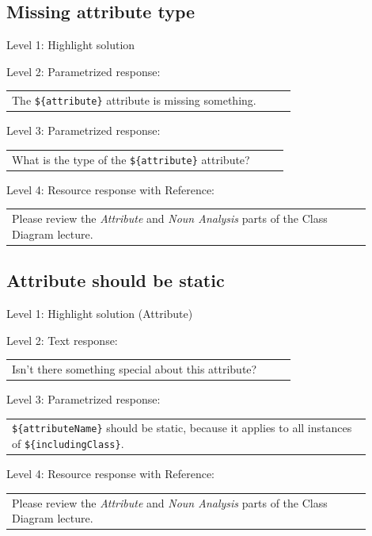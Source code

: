 \subsection{Missing attribute type}

\noindent Level 1: Highlight solution  \medskip

\noindent Level 2: Parametrized response: \medskip

\begin{tabular}{|p{0.9\linewidth}}
The \verb|${attribute}| attribute is missing something.
\end{tabular} \medskip

\noindent Level 3: Parametrized response: \medskip

\begin{tabular}{|p{0.9\linewidth}}
What is the type of the \verb|${attribute}| attribute?
\end{tabular} \medskip

\noindent Level 4: Resource response with Reference: \medskip

\begin{tabular}{|p{0.9\linewidth}}
Please review the \textit{Attribute} and \textit{Noun Analysis} parts of the Class Diagram lecture.
\end{tabular} \medskip


\subsection{Attribute should be static}

\noindent Level 1: Highlight solution (Attribute) \medskip

\noindent Level 2: Text response: \medskip

\begin{tabular}{|p{0.9\linewidth}}
Isn't there something special about this attribute?
\end{tabular} \medskip

\noindent Level 3: Parametrized response: \medskip

\begin{tabular}{|p{0.9\linewidth}}
\verb|${attributeName}| should be static, because it applies to all instances of \verb|${includingClass}|.
\end{tabular} \medskip

\noindent Level 4: Resource response with Reference: \medskip

\begin{tabular}{|p{0.9\linewidth}}
Please review the \textit{Attribute} and \textit{Noun Analysis} parts of the Class Diagram lecture.
\end{tabular} \medskip


